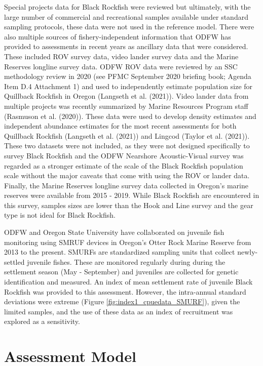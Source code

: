 \documentclass[11pt,
  letterpaper,
]{article}
\begin{document}
Special projects data for Black Rockfish were reviewed but ultimately, with the large number of commercial and recreational samples available under standard sampling protocols, these data were not used in the reference model. There were also multiple sources of fishery-independent information that ODFW has provided to assessments in recent years as ancillary data that were considered. These included ROV survey data, video lander survey data and the Marine Reserves longline survey data. ODFW ROV data were reviewed by an SSC methodology review in 2020 (see PFMC September 2020 briefing book; Agenda Item D.4 Attachment 1) and used to independently estimate population size for Quillback Rockfish in Oregon (Langseth et al. (2021)). Video lander data from multiple projects was recently summarized by Marine Resources Program staff (Rasmuson et al. (2020)). These data were used to develop density estimates and independent abundance estimates for the most recent assessments for both Quillback Rockfish (Langseth et al. (2021)) and Lingcod (Taylor et al. (2021)). These two datasets were not included, as they were not designed specifically to survey Black Rockfish and the ODFW Nearshore Acoustic-Visual survey was regarded as a stronger estimate of the scale of the Black Rockfish population scale without the major caveats that come with using the ROV or lander data. Finally, the Marine Reserves longline survey data collected in Oregon's marine reserves were available from 2015 - 2019. While Black Rockfish are encountered in this survey, samples sizes are lower than the Hook and Line survey and the gear type is not ideal for Black Rockfish.

ODFW and Oregon State University have collaborated on juvenile fish monitoring using SMRUF devices in Oregon's Otter Rock Marine Reserve from 2013 to the present. SMURFs are standardized sampling units that collect newly-settled juvenile fishes. These are monitored regularly during during the settlement season (May - September) and juveniles are collected for genetic identification and measured. An index of mean settlement rate of juvenile Black Rockfish was provided to this assessment. However, the intra-annual standard deviations were extreme (Figure \ref{fig:index1_cpuedata_SMURF}), given the limited samples, and the use of these data as an index of recruitment was explored as a sensitivity.

\hypertarget{assessment-model}{%
\section{Assessment Model}\label{assessment-model}}
\end{document}

